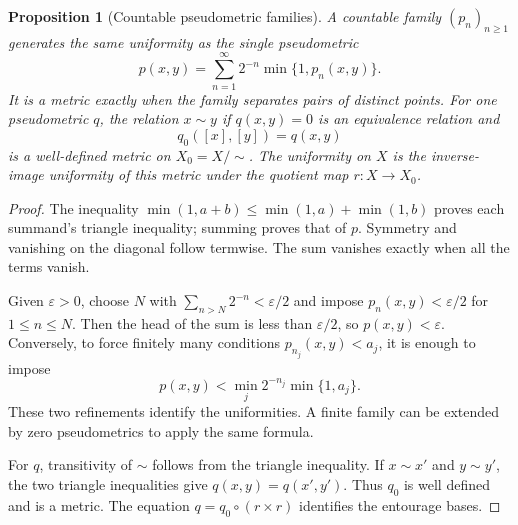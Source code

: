 \documentclass[11pt,oneside,openany]{book}
\newtheorem{proposition}[theorem]{Proposition}
\theoremstyle{definition}
\theoremstyle{remark}
\newcommand{\eps}{\varepsilon}
\begin{document}
\begin{proposition}[Countable pseudometric families]\label{d10:12:countable-pseudometrics}
A countable family $(p_n)_{n\geq1}$ generates the same uniformity as the single pseudometric
\[
 p(x,y)=\sum_{n=1}^\infty 2^{-n}\min\{1,p_n(x,y)\}.
\]
It is a metric exactly when the family separates pairs of distinct points. For one pseudometric $q$, the relation $x\sim y$ if $q(x,y)=0$ is an equivalence relation and
\[
 q_0([x],[y])=q(x,y)
\]
is a well-defined metric on $X_0=X/{\sim}$. The uniformity on $X$ is the inverse-image uniformity of this metric under the quotient map $r:X\to X_0$.
\end{proposition}
\begin{proof}
The inequality $\min(1,a+b)\leq\min(1,a)+\min(1,b)$ proves each summand's triangle inequality; summing proves that of $p$. Symmetry and vanishing on the diagonal follow termwise. The sum vanishes exactly when all the terms vanish.

Given $\eps>0$, choose $N$ with $\sum_{n>N}2^{-n}<\eps/2$ and impose $p_n(x,y)<\eps/2$ for $1\leq n\leq N$. Then the head of the sum is less than $\eps/2$, so $p(x,y)<\eps$. Conversely, to force finitely many conditions $p_{n_j}(x,y)<a_j$, it is enough to impose
\[
 p(x,y)<\min_j 2^{-n_j}\min\{1,a_j\}.
\]
These two refinements identify the uniformities. A finite family can be extended by zero pseudometrics to apply the same formula.

For $q$, transitivity of $\sim$ follows from the triangle inequality. If $x\sim x'$ and $y\sim y'$, the two triangle inequalities give $q(x,y)=q(x',y')$. Thus $q_0$ is well defined and is a metric. The equation $q=q_0\circ(r\times r)$ identifies the entourage bases.
\end{proof}
\end{document}
